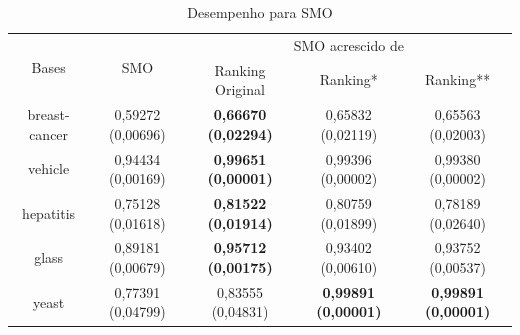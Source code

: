 \begin{table}[h]
    \begin{tabular}{ c c c c c }
        \hline

        \multirow{2}{*}{Bases} & \multirow{2}{*}{SMO} & \multicolumn{3}{c}{SMO acrescido de} \\ \cline{3-5}
        & & {\small Ranking Original} & {\small Ranking*} & {\small  Ranking**} \\
        
        \hline
        
        breast-cancer & {\small 0,59272 (0,00696)} & {\small \textbf{0,66670 (0,02294)}} & {\small 0,65832 (0,02119)} & {\small 0,65563 (0,02003)} \\
        vehicle & {\small 0,94434 (0,00169)} & {\small \textbf{0,99651 (0,00001)}} & {\small 0,99396 (0,00002)} & {\small 0,99380 (0,00002)} \\
        hepatitis & {\small 0,75128 (0,01618)} & {\small \textbf{0,81522 (0,01914)}} & {\small 0,80759 (0,01899)} & {\small 0,78189 (0,02640)} \\
        glass & {\small 0,89181 (0,00679)} & {\small \textbf{0,95712 (0,00175)}} & {\small 0,93402 (0,00610)} & {\small 0,93752 (0,00537)} \\
        yeast & {\small 0,77391 (0,04799)} & {\small 0,83555 (0,04831)} & {\small \textbf{0,99891 (0,00001)}} & {\small \textbf{0,99891 (0,00001)}} \\
    
        \hline
    \end{tabular}
    
    \caption{Desempenho para SMO}
    \label{smo_results_table}
\end{table}
